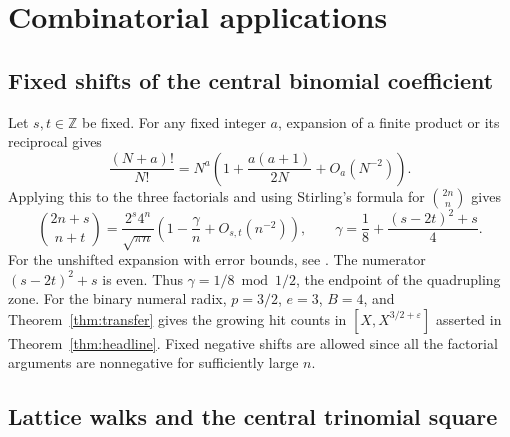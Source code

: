 \documentclass[11pt,reqno,a4paper]{amsart}
\theoremstyle{remark}
\begin{document}
\section{Combinatorial applications}\label{sec:applications}

\subsection{Fixed shifts of the central binomial coefficient}

Let \(s,t\in\mathbb Z\) be fixed. For any fixed integer \(a\), expansion
of a finite product or its reciprocal gives
\[
 \frac{(N+a)!}{N!}
 =N^a\left(1+\frac{a(a+1)}{2N}+O_a(N^{-2})\right).
\]
Applying this to the three factorials and using Stirling's formula
for \(\binom{2n}{n}\) gives
\begin{equation}\label{eq:app-shifted-binomial}
 \binom{2n+s}{n+t}
 =\frac{2^s4^n}{\sqrt{\pi n}}
  \left(1-\frac{\gamma}{n}+O_{s,t}(n^{-2})\right),
 \qquad
 \gamma=\frac18+\frac{(s-2t)^2+s}{4}.
\end{equation}
For the unshifted expansion with error bounds, see \cite{app-brent}.
The numerator \((s-2t)^2+s\) is even. Thus
\(\gamma=1/8\bmod 1/2\), the endpoint of the quadrupling zone.
For the binary numeral radix, \(p=3/2\), \(e=3\), \(B=4\), and
Theorem~\ref{thm:transfer} gives the growing hit counts in
\([X,X^{3/2+\varepsilon}]\) asserted in Theorem~\ref{thm:headline}. Fixed negative shifts are allowed since
all the factorial arguments are nonnegative for sufficiently large
\(n\).

\subsection{Lattice walks and the central trinomial square}
\end{document}
